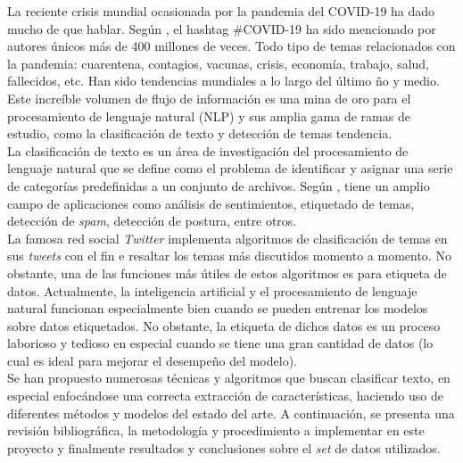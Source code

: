 La reciente crisis mundial ocasionada por la pandemia del COVID-19 ha dado mucho de que hablar. Según \cite{Twitter_blog}, el hashtag \#COVID-19 ha sido mencionado por autores únicos más de 400 millones de veces. Todo tipo de temas relacionados con la pandemia: cuarentena, contagios, vacunas, crisis, economía, trabajo, salud, fallecidos, etc. Han sido tendencias mundiales a lo largo del último ño y medio. Este increíble volumen de flujo de información es una mina de oro para el procesamiento de lenguaje natural (NLP) y sus amplia gama de ramas de estudio, como la clasificación de texto y detección de temas tendencia.\\

La clasificación de texto es un área de investigación del procesamiento de lenguaje natural que se define como el problema de identificar y asignar una serie de categorías predefinidas a un conjunto de archivos. Según \cite{mokey_learn}, tiene un amplio campo de aplicaciones como análisis de sentimientos, etiquetado de temas, detección de \textit{spam}, detección de postura, entre otros.\\

La famosa red social \textit{Twitter} implementa algoritmos de clasificación de temas en sus \textit{tweets} con el fin e resaltar los temas más discutidos momento a momento. No obstante, una de las funciones más útiles de estos algoritmos es para etiqueta de datos. Actualmente, la inteligencia artificial y el procesamiento de lenguaje natural funcionan especialmente bien cuando se pueden entrenar los modelos sobre datos etiquetados. No obstante, la etiqueta de dichos datos es un proceso laborioso y tedioso en especial cuando se tiene una gran cantidad de datos (lo cual es ideal para mejorar el desempeño del modelo).\\

Se han propuesto numerosas técnicas y algoritmos que buscan clasificar texto, en especial enfocándose una correcta extracción de características, haciendo uso de diferentes métodos y modelos del estado del arte. A continuación, se presenta una revisión bibliográfica, la metodología y procedimiento a implementar en este proyecto y finalmente resultados y conclusiones sobre el \textit{set} de datos utilizados.